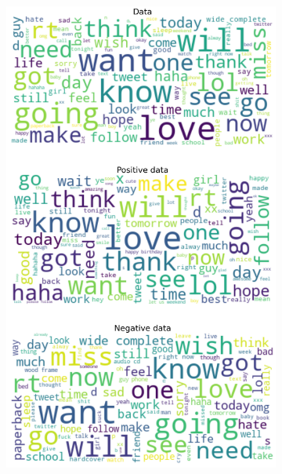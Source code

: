 \documentclass{article}
\begin{document}
\begin{itemize}
\begin{figure}[H]
\begin{subfigure}[b]{0.24\textwidth}
\includegraphics[width=\textwidth]{chapter-06/section-01-01/10/visualization/2/wordcloud.png}
\end{subfigure}
\begin{subfigure}[b]{0.24\textwidth}
\centering

\end{subfigure}
\end{figure}
\end{itemize}
\end{document}
